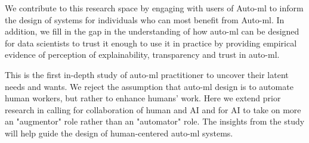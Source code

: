 We contribute to this research space by engaging with users of Auto-ml to inform the design of systems for individuals who can most benefit from Auto-ml. In addition, we fill in the gap in the understanding of how auto-ml can be designed for data scientists to trust it enough to use it in practice by providing empirical evidence of perception of explainability, transparency and trust in auto-ml.

This is the first in-depth study of auto-ml practitioner to uncover their latent needs and wants. We reject the assumption that auto-ml design is to automate human workers, but rather to enhance humans' work. Here we extend prior research in calling for collaboration of human and AI and for AI to take on more an "augmentor" role rather than an "automator" role. The insights from the study will help guide the design of human-centered auto-ml systems. 


